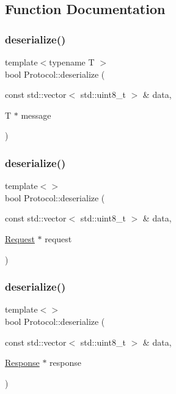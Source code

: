 \subsection{Function Documentation}
\mbox{\label{namespaceProtocol_affe27ed8631c1368f3076ccd6499fb2f}} 
\subsubsection{\texorpdfstring{deserialize()}{deserialize()}\hspace{0.1cm}{\footnotesize\ttfamily [1/3]}}
{\footnotesize\ttfamily template$<$typename T $>$ \\
bool Protocol\+::deserialize (\begin{DoxyParamCaption}\item[{const std\+::vector$<$ std\+::uint8\+\_\+t $>$ \&}]{data,  }\item[{T $\ast$}]{message }\end{DoxyParamCaption})}

\mbox{\label{namespaceProtocol_a8ffab1eaeb22f833bf66d459e0779e8e}} 
\subsubsection{\texorpdfstring{deserialize()}{deserialize()}\hspace{0.1cm}{\footnotesize\ttfamily [2/3]}}
{\footnotesize\ttfamily template$<$$>$ \\
bool Protocol\+::deserialize (\begin{DoxyParamCaption}\item[{const std\+::vector$<$ std\+::uint8\+\_\+t $>$ \&}]{data,  }\item[{\hyperlink{structProtocol_1_1Request}{Request} $\ast$}]{request }\end{DoxyParamCaption})}

\mbox{\label{namespaceProtocol_a89a2ebe25b5f049e779e4c451712a4d4}} 
\subsubsection{\texorpdfstring{deserialize()}{deserialize()}\hspace{0.1cm}{\footnotesize\ttfamily [3/3]}}
{\footnotesize\ttfamily template$<$$>$ \\
bool Protocol\+::deserialize (\begin{DoxyParamCaption}\item[{const std\+::vector$<$ std\+::uint8\+\_\+t $>$ \&}]{data,  }\item[{\hyperlink{structProtocol_1_1Response}{Response} $\ast$}]{response }\end{DoxyParamCaption})}

